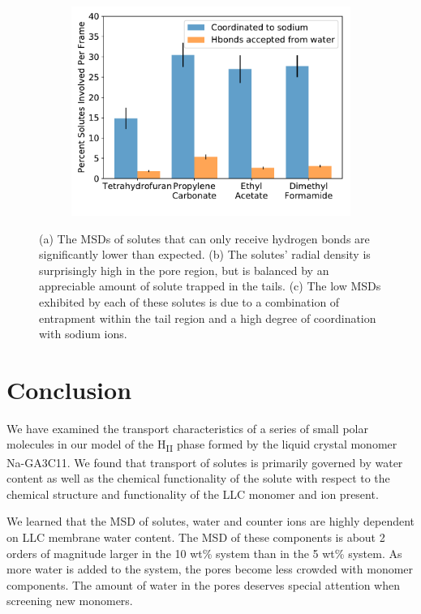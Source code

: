 \documentclass[journal=jpcbfk,manuscript=article]{achemso}
\begin{document}
\begin{figure}[!htb]
\begin{subfigure}{0.325\textwidth}
  \caption{}\label{fig:nondonors_rdf}
  \end{subfigure}
  \begin{subfigure}{0.325\textwidth}
  \includegraphics[width=\textwidth]{nondonor_hbonds.pdf}
  \caption{}\label{fig:nondonors_hbonds}
  \end{subfigure}
  \caption{(a) The MSDs of solutes that can only receive hydrogen bonds are
  significantly lower than expected. (b) The solutes' radial density
  is surprisingly high in the pore region, but is balanced by an appreciable
  amount of solute trapped in the tails. (c) The low MSDs exhibited by each of these
  solutes is due to a combination of entrapment within the tail region and a high 
  degree of coordination with sodium ions.}\label{fig:nondonors}
  \end{figure}

  \section{Conclusion}

  We have examined the transport characteristics of a series of small polar
  molecules in our model of the H\textsubscript{II} phase formed by the liquid 
  crystal monomer Na-GA3C11. We found that transport of solutes is primarily
  governed by water content as well as the chemical functionality of the solute
  with respect to the chemical structure and functionality of the LLC monomer 
  and ion present. 
  
  We learned that the MSD of solutes, water and counter ions are highly 
  dependent on LLC membrane water content. The MSD of these components is about
  2 orders of magnitude larger in the 10 wt\% system than in the 5 wt\% system.
  As more water is added to the system, the pores become less crowded with monomer
  components. The amount of water in the pores deserves special attention when 
  screening new monomers.
  
\end{document}
